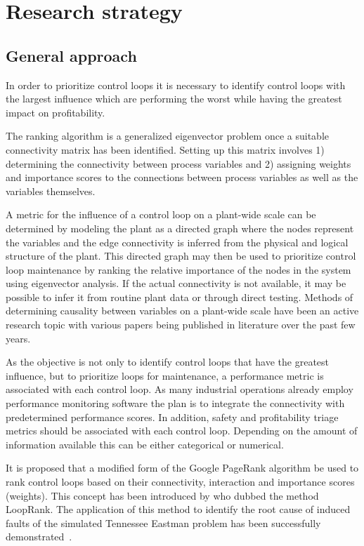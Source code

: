 \documentclass{article}
\begin{document}
\newpage
\section{Research strategy}

\subsection{General approach}

In order to prioritize control loops it is necessary to identify control loops with the largest influence which are performing the worst while having the greatest impact on profitability.

The ranking algorithm is a generalized eigenvector problem once a suitable connectivity matrix has been identified. Setting up this matrix involves 1) determining the connectivity between process variables and 2) assigning weights and importance scores to the connections between process variables as well as the variables themselves.

A metric for the influence of a control loop on a plant-wide scale can be determined by modeling the plant as a directed graph where the nodes represent the variables and the edge connectivity is inferred from the physical and logical structure of the plant.
This directed graph may then be used to prioritize control loop maintenance by ranking the relative importance of the nodes in the system using eigenvector analysis.
If the actual connectivity is not available, it may be possible to infer it from routine plant data or through direct testing.
Methods of determining causality between variables on a plant-wide scale have been an active research topic with various papers being published in literature over the past few years.

As the objective is not only to identify control loops that have the greatest influence, but to prioritize loops for maintenance, a performance metric is associated with each control loop.
As many industrial operations already employ performance monitoring software the plan is to integrate the connectivity with predetermined performance scores.
In addition, safety and profitability triage metrics should be associated with each control loop.
Depending on the amount of information available this can be either categorical or numerical.

It is proposed that a modified form of the Google PageRank algorithm be used to rank control loops based on their connectivity, interaction and importance scores (weights). This concept has been introduced by \citet{Farenzena2009} who dubbed the method LoopRank. The application of this method to identify the root cause of induced faults of the simulated Tennessee Eastman problem has been successfully demonstrated~\cite{Wilken2012}.
\end{document}
